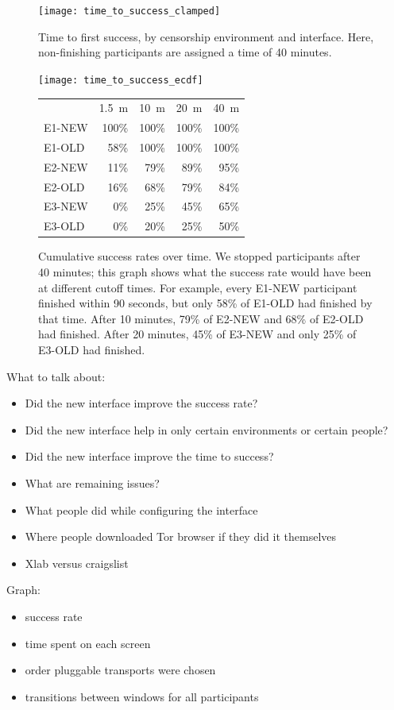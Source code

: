 \documentclass[USenglish,oneside,twocolumn]{article}
\begin{document}
\begin{figure}
\centering
\texttt{[image: time\_to\_success\_clamped]}
\caption{
Time to first success, by censorship environment and interface.
Here, non-finishing participants are assigned a time of 40 minutes.
}
\label{fig:time_to_success_clamped}
\end{figure}

\begin{figure}
\centering
\texttt{[image: time\_to\_success\_ecdf]}

\begin{tabular}{l r r r r}
& \multicolumn{1}{c}{1.5~m} & \multicolumn{1}{c}{10~m} & \multicolumn{1}{c}{20~m} & \multicolumn{1}{c}{40~m} \\
\noalign{\hrule}
E1-NEW & 100\% & 100\% & 100\% & 100\% \\
E1-OLD & 58\% & 100\% & 100\% & 100\% \\
E2-NEW & 11\% & 79\% & 89\% & 95\% \\
E2-OLD & 16\% & 68\% & 79\% & 84\% \\
E3-NEW & 0\% & 25\% & 45\% & 65\% \\
E3-OLD & 0\% & 20\% & 25\% & 50\% \\
\end{tabular}

\caption{
Cumulative success rates over time.
We stopped participants after 40 minutes;
this graph shows what the success rate would have been
at different cutoff times.
For example, every E1-NEW participant finished within 90 seconds,
but only 58\% of E1-OLD had finished by that time.
After 10 minutes, 79\% of E2-NEW and 68\% of E2-OLD had finished.
After 20 minutes, 45\% of E3-NEW and only 25\% of E3-OLD had finished.
}
\label{fig:time_to_success_ecdf}
\end{figure}

{\color {red} 
What to talk about: 
\begin{itemize}
\item{Did the new interface improve the success rate?}
\item{Did the new interface help in only certain environments or certain people?}
\item{Did the new interface improve the time to success?}
\item{What are remaining issues?} 
\item{What people did while configuring the interface}
\item{Where people downloaded Tor browser if they did it themselves} 
\item{Xlab versus craigslist} 
\end{itemize} 

Graph: 
\begin{itemize}
\item{success rate}
\item{time spent on each screen}
\item{order pluggable transports were chosen}
\item{transitions between windows for all participants}
\end{itemize} 
} 
\end{document}
